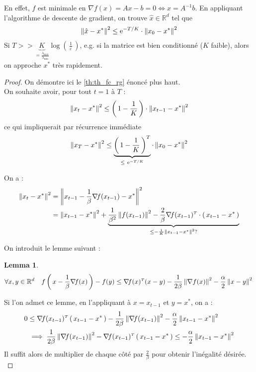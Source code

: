\documentclass[11pt]{article}
\newcommand{\transpose}[1]{\ensuremath{#1^{\scriptscriptstyle T}}}
\newcommand{\dotpourvariable}{\:\cdot\:}
\newcommand{\ifempty}[3]{\ifx\hfuzz#1\hfuzz #2 \else #3\fi}
\newcommand{\norme}[1]{\left\lVert\ifempty{#1}{\dotpourvariable}{#1}\right\rVert}
\newcommand{\prt}[1]{\left( \, #1  \, \right)}
\newcommand{\R}{\mathbb{R}} %
\newcommand*{\e}{\ensuremath{\mathrm{e}}}
\newtheorem{lemma}[theorem]{Lemma}
\begin{document}
 En effet, $f$ est minimale en $\nabla\! f(x) = Ax-b = 0 \Leftrightarrow x=A^{-1}b$.
 En appliquant l'algorithme de descente de gradient, on trouve $\hat{x} \in \R^d$ tel que
 \begin{align*}
\norme{\hat{x} - x^{*}}^2 \leq \e^{-T/K}\cdot \norme{x_0-x^{*}}^2
 \end{align*}
 Si $T >> \underbrace{K}_{= \frac{\lambda_{\max}}{\lambda_{\min}}} \log \prt{\frac{1}{\varepsilon}} $, e.g. si la matrice est bien conditionné ($K$ faible),
  alors on approche $x^{*}$ très rapidement. \\

  \begin{proof}
    On démontre ici le \autoref{th:th_fc_rg} énoncé plus haut. \\

    On souhaite avoir, pour tout $t=1$ à $T$ :
    \begin{align}
      \norme{x_t-x^{*}}^2\leq \prt{1- \frac{1}{K}} \cdot \norme{x_{t-1}-x^{*}}^2
    \end{align}
    ce qui impliquerait par récurrence immédiate
    \begin{align}
      \norme{x_T-x^{*}}^2\leq \underbrace{\prt{1- \frac{1}{K}}^T}_{\leq ~\e^{-T/K}}\cdot \norme{x_{0}-x^{*}}^2
    \end{align}

    On a :
    \begin{align*}
      \norme{x_t-x^{*}}^2&= \norme{x_{t-1}-\frac{1}{\beta} \nabla\! f(x_{t-1})-x^{*}}^2\\
      &= \norme{x_{t-1}-x^{*}}^2+\underbrace{\frac{1}{\beta^2} \norme{f(x_{t-1})}^2-
      \frac{2}{\beta}\transpose{\nabla\! f(x_{t-1})} \cdot \prt{x_{t-1}-x^{*}}}_{\leq
      -\frac{1}{K}\norme{x_{t-1}-x^{*}}^2?
      }
    \end{align*}

On introduit le lemme suivant :
    \begin{lemma}
      \begin{equation*}
        \forall x, y \in \R^d \quad f\prt{x-\frac{1}{\beta} \nabla\! f(x)} - f(y)
        \leq \transpose{\nabla\! f(x)} (x-y)-\frac{1}{2 \beta } \norme{\nabla f(x)}^2
        - \frac{\alpha}{2} \norme{x-y}^2 \\
      \end{equation*}
    \end{lemma}

Si l'on admet ce lemme, en l'appliquant à $x = x_{t-1}$ et $y = x^{*}$, on a : \\
    \begin{align*}
0 &\leq \transpose{\nabla\! f(x_{t-1})}\prt{x_{t-1}-x^{*}}
-\frac{1}{2 \beta} \norme{\nabla\! f(x_{t-1})}^2 - \frac{\alpha}{2} \norme{x_{t-1}-x^{*}}^2\\
&\implies \frac{1}{2\beta } \norme{\nabla\! f(x_{t-1})}^2-\transpose{\nabla\! f(x_{t-1})}\prt{x_{t-1}-x^{*}} \leq - \frac{\alpha}{2} \norme{x_{t-1}-x^{*}}^2 \\
    \end{align*}
Il suffit alors de multiplier de chaque côté par $\frac{2}{\beta}$ pour obtenir l'inégalité désirée. \\


\end{proof}
\end{document}
